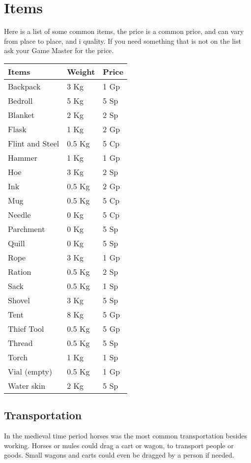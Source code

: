 \chapter{Items}
Here is a list of some common items, the price is a common price, and can vary from place to place, and i quality.
If you need something that is not on the list ask your Game Master for the price.
\begin{center}
\begin{tabular}{|l|l|l|}\hline
\rowcolor{gray!50}
    \textbf{Items}  &\textbf{Weight}    &\textbf{Price} \\ \hline
    Backpack        & 3 Kg    & 1 Gp\\
    Bedroll         & 5 Kg    & 5 Sp\\
    Blanket         & 2 Kg    & 2 Sp\\
    Flask           & 1 Kg    & 2 Gp\\
    Flint and Steel & 0.5 Kg  & 5 Cp\\
    Hammer          & 1 Kg    & 1 Gp\\
    Hoe             & 3 Kg    & 2 Sp\\
    Ink             & 0.5 Kg  & 2 Gp\\
    Mug             & 0.5 Kg  & 5 Cp\\
    Needle          & 0 Kg    & 5 Cp\\
    Parchment       & 0 Kg    & 5 Sp\\
    Quill           & 0 Kg    & 5 Sp\\
    Rope            & 3 Kg    & 1 Gp\\
    Ration          & 0.5 Kg  & 2 Sp\\
    Sack            & 0.5 Kg  & 1 Sp\\
    Shovel          & 3 Kg    & 5 Sp\\
    Tent            & 8 Kg    & 5 Gp\\
    Thief Tool      & 0.5 Kg  & 5 Gp\\
    Thread          & 0.5 Kg  & 5 Sp\\
    Torch           & 1 Kg    & 1 Sp\\
    Vial (empty)    & 0.5 Kg  & 1 Gp\\
    Water skin      & 2 Kg    & 5 Sp\\
    \hline
\end{tabular}
\end{center}

\section{Transportation}
In the medieval time period horses was the most common transportation besides working.
Horses or mules could drag a cart or wagon, to transport people or goods.
Small wagons and carts could even be dragged by a person if needed.

